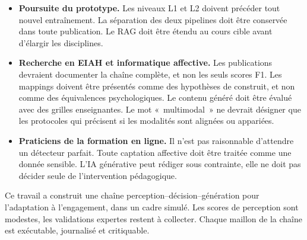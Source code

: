 \begin{itemize}[leftmargin=1.4em]
  \item \textbf{Poursuite du prototype.} Les niveaux L1 et L2 doivent
  précéder tout nouvel entraînement. La séparation des deux pipelines
  doit être conservée dans toute publication. Le RAG doit être étendu
  au cours cible avant d'élargir les disciplines.

  \item \textbf{Recherche en EIAH et informatique affective.} Les
  publications devraient documenter la chaîne complète, et non les
  seuls scores F1. Les mappings doivent être présentés comme des
  hypothèses de construit, et non comme des équivalences
  psychologiques. Le contenu généré doit être évalué avec des grilles
  enseignantes. Le mot «~multimodal~» ne devrait désigner que les
  protocoles qui précisent si les modalités sont alignées ou
  appariées.

  \item \textbf{Praticiens de la formation en ligne.} Il n'est pas
  raisonnable d'attendre un détecteur parfait. Toute captation
  affective doit être traitée comme une donnée sensible. L'IA
  générative peut rédiger sous contrainte, elle ne doit pas décider
  seule de l'intervention pédagogique.
\end{itemize}

Ce travail a construit une chaîne perception--décision--génération pour
l'adaptation à l'engagement, dans un cadre simulé. Les scores de
perception sont modestes, les validations expertes restent à collecter.
Chaque maillon de la chaîne est exécutable, journalisé et critiquable.
